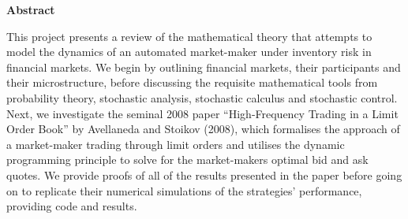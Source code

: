 \thispagestyle{plain}
\mbox{}
\vspace{60mm}
\begin{center}
    \textbf{Abstract}
\end{center}
This project presents a review of the mathematical theory that attempts to model the 
dynamics of an automated market-maker under inventory risk in financial markets. We 
begin by outlining financial markets, their participants and their microstructure, 
before discussing the requisite mathematical tools from probability theory, stochastic 
analysis, stochastic calculus and stochastic control. Next, we investigate the seminal 
2008 paper ``High-Frequency Trading in a Limit Order Book'' by Avellaneda and Stoikov 
(2008), which formalises the approach of a market-maker trading through limit orders 
and utilises the dynamic programming principle to solve for the market-makers optimal 
bid and ask quotes. We provide proofs of all of the results presented in the paper
before going on to replicate their numerical simulations of the strategies' performance,
providing code and results. 
\newpage